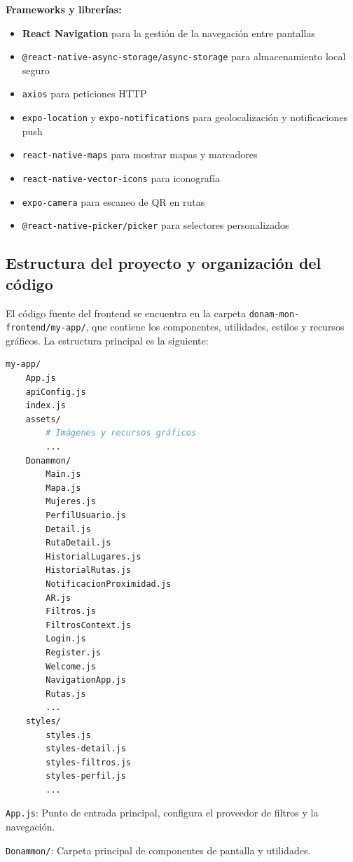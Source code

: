 \textbf{Frameworks y librerías:}
\begin{itemize}
    \item \textbf{React Navigation} para la gestión de la navegación entre pantallas
    \item \texttt{@react-native-async-storage/async-storage} para almacenamiento local seguro
    \item \texttt{axios} para peticiones HTTP
    \item \texttt{expo-location} y \texttt{expo-notifications} para geolocalización y notificaciones push
    \item \texttt{react-native-maps} para mostrar mapas y marcadores
    \item \texttt{react-native-vector-icons} para iconografía
    \item \texttt{expo-camera} para escaneo de QR en rutas
    \item \texttt{@react-native-picker/picker} para selectores personalizados
\end{itemize}

\subsection{Estructura del proyecto y organización del código}

El código fuente del frontend se encuentra en la carpeta \texttt{donam-mon-frontend/my-app/}, que contiene los componentes, utilidades, estilos y recursos gráficos. La estructura principal es la siguiente:

\begin{lstlisting}[language=bash, caption={Estructura principal del frontend}]
my-app/
    App.js
    apiConfig.js
    index.js
    assets/
        # Imágenes y recursos gráficos
        ...
    Donammon/
        Main.js
        Mapa.js
        Mujeres.js
        PerfilUsuario.js
        Detail.js
        RutaDetail.js
        HistorialLugares.js
        HistorialRutas.js
        NotificacionProximidad.js
        AR.js
        Filtros.js
        FiltrosContext.js
        Login.js
        Register.js
        Welcome.js
        NavigationApp.js
        Rutas.js
        ...
    styles/
        styles.js
        styles-detail.js
        styles-filtros.js
        styles-perfil.js
        ...
\end{lstlisting}

\texttt{App.js}: Punto de entrada principal, configura el proveedor de filtros y la navegación.

\texttt{Donammon/}: Carpeta principal de componentes de pantalla y utilidades.

